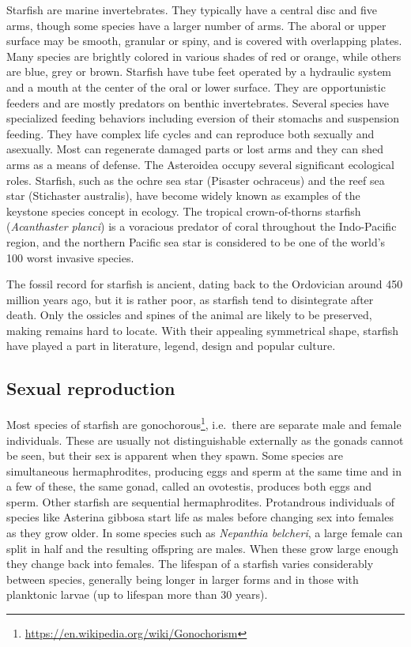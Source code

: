 \documentclass[]{book}
\let\rmarkdownfootnote\footnote%
\def\footnote{\protect\rmarkdownfootnote}
\renewcommand{\href}[2]{#2\footnote{\url{#1}}}
\theoremstyle{definition}
\theoremstyle{definition}
\theoremstyle{definition}
\theoremstyle{remark}
\begin{document}
Starfish are marine invertebrates. They typically have a central disc
and five arms, though some species have a larger number of arms. The
aboral or upper surface may be smooth, granular or spiny, and is covered
with overlapping plates. Many species are brightly colored in various
shades of red or orange, while others are blue, grey or brown. Starfish
have tube feet operated by a hydraulic system and a mouth at the center
of the oral or lower surface. They are opportunistic feeders and are
mostly predators on benthic invertebrates. Several species have
specialized feeding behaviors including eversion of their stomachs and
suspension feeding. They have complex life cycles and can reproduce both
sexually and asexually. Most can regenerate damaged parts or lost arms
and they can shed arms as a means of defense. The Asteroidea occupy
several significant ecological roles. Starfish, such as the ochre sea
star (Pisaster ochraceus) and the reef sea star (Stichaster australis),
have become widely known as examples of the keystone species concept in
ecology. The tropical crown-of-thorns starfish (\emph{Acanthaster planci}) is a
voracious predator of coral throughout the Indo-Pacific region, and the
northern Pacific sea star is considered to be one of the world's 100
worst invasive species.

The fossil record for starfish is ancient, dating back to the Ordovician
around 450 million years ago, but it is rather poor, as starfish tend to
disintegrate after death. Only the ossicles and spines of the animal are
likely to be preserved, making remains hard to locate. With their
appealing symmetrical shape, starfish have played a part in literature,
legend, design and popular culture.

\subsection{Sexual reproduction}\label{sexual-reproduction-1}

Most species of starfish are
\href{https://en.wikipedia.org/wiki/Gonochorism}{gonochorous},
i.e.~there are separate male and female individuals. These are usually
not distinguishable externally as the gonads cannot be seen, but their
sex is apparent when they spawn. Some species are simultaneous
hermaphrodites, producing eggs and sperm at the same time and in a few
of these, the same gonad, called an ovotestis, produces both eggs and
sperm. Other starfish are sequential hermaphrodites. Protandrous
individuals of species like Asterina gibbosa start life as males before
changing sex into females as they grow older. In some species such as
\emph{Nepanthia belcheri}, a large female can split in half and the resulting
offspring are males. When these grow large enough they change back into
females. The lifespan of a starfish varies considerably between species,
generally being longer in larger forms and in those with planktonic
larvae (up to lifespan more than 30 years).
\end{document}

